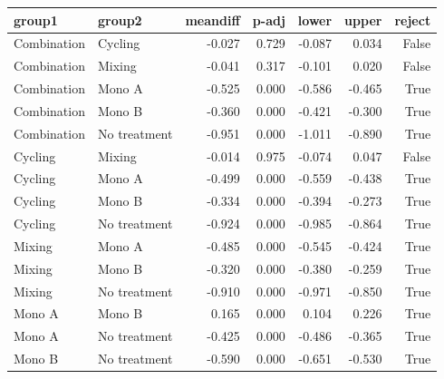 \begin{tabular}{llrrrrr}
\toprule
group1 & group2 & meandiff & p-adj & lower & upper & reject \\
\midrule
Combination & Cycling & -0.027 & 0.729 & -0.087 & 0.034 & False \\
Combination & Mixing & -0.041 & 0.317 & -0.101 & 0.020 & False \\
Combination & Mono A & -0.525 & 0.000 & -0.586 & -0.465 & True \\
Combination & Mono B & -0.360 & 0.000 & -0.421 & -0.300 & True \\
Combination & No treatment & -0.951 & 0.000 & -1.011 & -0.890 & True \\
Cycling & Mixing & -0.014 & 0.975 & -0.074 & 0.047 & False \\
Cycling & Mono A & -0.499 & 0.000 & -0.559 & -0.438 & True \\
Cycling & Mono B & -0.334 & 0.000 & -0.394 & -0.273 & True \\
Cycling & No treatment & -0.924 & 0.000 & -0.985 & -0.864 & True \\
Mixing & Mono A & -0.485 & 0.000 & -0.545 & -0.424 & True \\
Mixing & Mono B & -0.320 & 0.000 & -0.380 & -0.259 & True \\
Mixing & No treatment & -0.910 & 0.000 & -0.971 & -0.850 & True \\
Mono A & Mono B & 0.165 & 0.000 & 0.104 & 0.226 & True \\
Mono A & No treatment & -0.425 & 0.000 & -0.486 & -0.365 & True \\
Mono B & No treatment & -0.590 & 0.000 & -0.651 & -0.530 & True \\
\bottomrule
\end{tabular}
